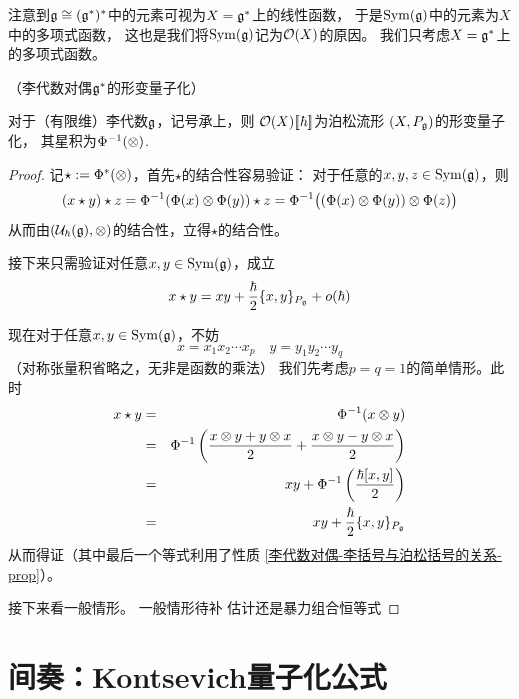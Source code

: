 注意到$\mathfrak{g}\cong(\mathfrak{g}^*)^*$中的元素可视为$X=\mathfrak{g}^*$上的线性函数，
于是$\operatorname{Sym}(\mathfrak{g})$中的元素为$X$中的多项式函数，
这也是我们将$\operatorname{Sym}(\mathfrak{g})$记为$\mathcal{O}(X)$的原因。
我们只考虑$X=\mathfrak{g}^*$上的多项式函数。


\begin{Example}（李代数对偶$\mathfrak{g}^*$的形变量子化）

对于（有限维）李代数$\mathfrak{g}$，记号承上，则
$\mathcal{O}(X)[\![\hbar]\!]$为泊松流形
$(X,P_{\mathfrak{g}})$的形变量子化，
其星积为$\Phi^{-1}(\otimes)$.
\end{Example}

\begin{proof}
记$\star:=\Phi^*(\otimes)$，首先$\star$的结合性容易验证：
对于任意的$x,y,z\in\operatorname{Sym}(\mathfrak{g})$，则
\begin{eqnarray*}
(x\star y)\star z=\Phi^{-1}(\Phi(x)\otimes\Phi(y))\star z
=\Phi^{-1}\big((\Phi(x)\otimes\Phi(y))\otimes \Phi(z)\big)
\end{eqnarray*}
从而由$(\mathcal{U}_{\hbar}(\mathfrak{g}),\otimes)$的结合性，立得$\star$的结合性。

接下来只需验证对任意$x,y\in\operatorname{Sym}(\mathfrak{g})$，成立
$$x\star y=xy+\frac{\hbar}{2}\{x,y\}_{P_{\mathfrak{g}}}+o(\hbar)$$

现在对于任意$x,y\in\operatorname{Sym}(\mathfrak{g})$，不妨
$$x=x_1x_2\cdots x_p\quad y=y_1y_2\cdots y_q$$
（对称张量积省略之，无非是函数的乘法）
我们先考虑$p=q=1$的简单情形。此时
\begin{eqnarray*}
     x\star y
&=&
     \Phi^{-1}
     (x\otimes y)\\
&=&
     \Phi^{-1}
     \left(
       \frac{x\otimes y+ y\otimes x}{2}
      +\frac{x\otimes y- y\otimes x}{2}
     \right)\\
&=&
    xy+\Phi^{-1}
    \left(
      \frac{\hbar[x,y]}{2}
    \right)\\
&=&
    xy+\frac{\hbar}{2}\{x,y\}_{P_{\mathfrak{g}}}
\end{eqnarray*}
从而得证（其中最后一个等式利用了性质
\ref{李代数对偶-李括号与泊松括号的关系-prop}）。

接下来看一般情形。
{\color{red}
一般情形待补
\color{blue}
估计还是暴力组合恒等式}
\end{proof}


\section{间奏：Kontsevich量子化公式}

